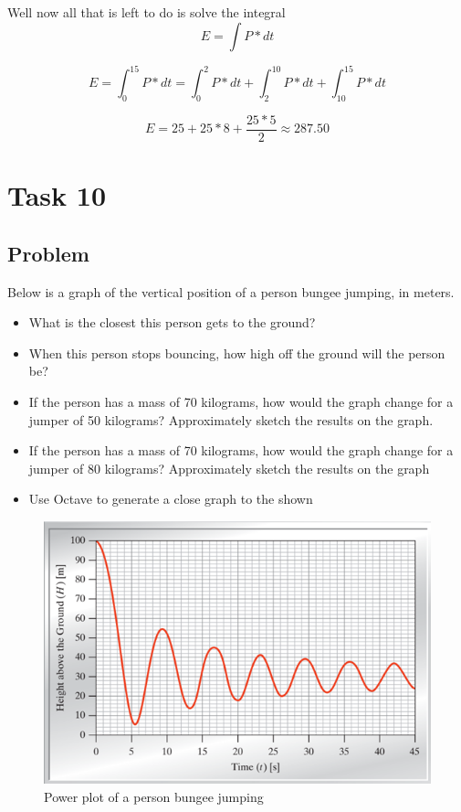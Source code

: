 \documentclass[a4paper, 10pt]{article}
\begin{document}
\begin{enumerate}
					\noindent Well now all that is left to do is solve the integral 
					\[E = \int P * dt\]
					
					\begin{equation}
						E = \int_{0}^{15}P*dt = \int_{0}^{2}P*dt + \int_{2}^{10}P*dt + \int_{10}^{15}P*dt
					\end{equation}
				
					\begin{equation}
						E = 25 + 25*8 + \frac{25 * 5}{2} \approx  287.50
					\end{equation}
			\end{enumerate}
		\pagebreak
		
	\section{Task 10}
	
		\subsection{Problem}
			\noindent Below is a graph of the vertical position of a person bungee jumping, in meters.
			\begin{itemize}
				\item What is the closest this person gets to the ground?
				\item When this person stops bouncing, how high off the ground will the person be?
				\item If the person has a mass of 70 kilograms, how would the graph change for a jumper of 50 kilograms? Approximately sketch the results on the graph.
				\item If the person has a mass of 70 kilograms, how would the graph change for a jumper of 80 kilograms? Approximately sketch the results on the graph
				\item Use Octave to generate a close graph to the shown 
			\end{itemize}
		
			\begin{figure}[h]
				\centering
				\includegraphics[scale = 0.35]{Task10Image}
				\caption{Power plot of a person bungee jumping}
				\label{fig:Task 10 problem}
			\end{figure}
\end{document}
